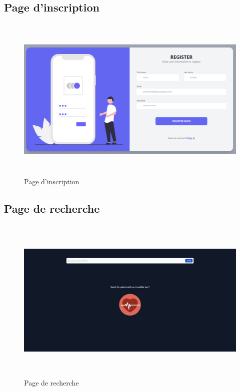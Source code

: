 \subsection{Page d'inscription}

\begin{figure}[!h]
\begin{center}
\includegraphics[height=8cm,width=18cm]{reg.png}
\end{center}
\caption{Page d'inscription}
\end{figure}

\newpage

\subsection{Page de recherche}

\begin{figure}[!h]
\begin{center}
\includegraphics[height=8cm,width=18cm]{search.jpeg}
\end{center}
\caption{Page de recherche}
\end{figure}


